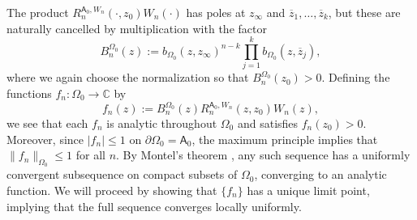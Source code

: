 \documentclass[12pt,oneside,reqno]{amsart}
\theoremstyle{definition}
\numberwithin{equation}{section}
\newcommand{\C}{{\mathbb C}}
\newcommand{\sfA}{\mathsf{A}}
\newcommand{\bbR}{\mathbb{R}}
\begin{document}
%

The product $R_n^{\sfA_0,W_n}(\cdot ,z_0)W_n(\cdot)$ has poles at $z_\infty$ and $\overline{z}_1,\dotsc,\overline{z}_k$, but these are naturally cancelled by multiplication with the factor
\begin{equation}
	B_n^{\Omega_0}(z):=b_{\Omega_0}(z,z_\infty)^{n-k}\prod_{j=1}^{k}b_{\Omega_0}(z,\overline{z}_j),
	\label{eq:B_0}
\end{equation}
where we again choose the normalization so that $B_n^{\Omega_0}(z_0)>0$. Defining the functions $f_n:\Omega_0\rightarrow\C$ by
\begin{equation}
	f_n(z) := B_{n}^{\Omega_0}(z)R_n^{\sfA_0,W_n}(z,z_0)W_n(z),
	\label{eq:f_n_sequence}
\end{equation}
we see that each $f_n$ is analytic throughout $\Omega_0$ and satisfies $f_n(z_0)>0$. Moreover, since $\vert f_n \vert \leq 1$ on $\partial\Omega_0 = \sfA_0$, the maximum principle implies that $\|f_n\|_{\Omega_0}\leq 1$ for all $n$. By Montel's theorem \cite[Theorem VII.2.9]{conway78}, any such sequence has a uniformly convergent subsequence on compact subsets of $\Omega_0$, converging to an analytic function. We will proceed by showing that $\{f_n\}$ has a unique limit point, implying that the full sequence converges locally uniformly.
\end{document}
